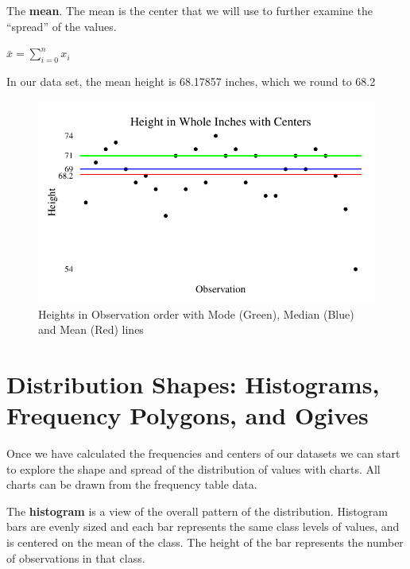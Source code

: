 \documentclass[nohyper,justified]{tufte-handout}\usepackage[]{graphicx}\usepackage[]{color}
\makeatletter
\def\maxwidth{ %
  \ifdim\Gin@nat@width>\linewidth
    \linewidth
  \else
    \Gin@nat@width
  \fi
}
\newenvironment{knitrout}{}{} %
\makeatother
\begin{document}
The \textbf{mean}. The mean is the center that we will use to further examine the ``spread'' of the values.

$\bar{x}=\sum\limits_{i=0}^{n} x_i$

In our data set, the mean height is 68.17857 inches, which we round to 68.2

\begin{figure}
\begin{knitrout}
\color{fgcolor}

{\centering \includegraphics[width=\maxwidth]{figure/graphics-center-chart-1} 

}



\end{knitrout}
\caption{Heights in Observation order with Mode (Green), Median (Blue) and Mean (Red) lines}
\end{figure}


\section{Distribution Shapes: Histograms, Frequency Polygons, and Ogives}

Once we have calculated the frequencies and centers of our datasets we can start to explore the shape and spread of the distribution of values with charts. All charts can be drawn from the frequency table data.

The \textbf{histogram} is a view of the overall pattern of the distribution. Histogram bars are evenly sized and each bar represents the same class levels of values, and is centered on the mean of the class. The height of the bar represents the number of observations in that class.
\end{document}

